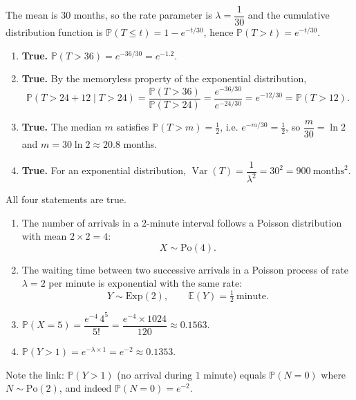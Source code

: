 \documentclass[11pt]{article}
\newcommand{\cle}[1]{{\popxbold\color{popdark}#1}}
\begin{document}
\begin{corrige}
The mean is $30$ months, so the rate parameter is $\lambda = \dfrac{1}{30}$ and the cumulative distribution function is $\mathbb{P}(T \le t) = 1 - e^{-t/30}$, hence $\mathbb{P}(T > t) = e^{-t/30}$.
\begin{enumerate}
\item \textbf{True.} $\mathbb{P}(T > 36) = e^{-36/30} = e^{-1.2}$.
\item \textbf{True.} By the \cle{memoryless property} of the exponential distribution,
\[
\mathbb{P}(T > 24 + 12 \mid T > 24) = \frac{\mathbb{P}(T > 36)}{\mathbb{P}(T > 24)} = \frac{e^{-36/30}}{e^{-24/30}} = e^{-12/30} = \mathbb{P}(T > 12).
\]
\item \textbf{True.} The median $m$ satisfies $\mathbb{P}(T > m) = \tfrac{1}{2}$, i.e. $e^{-m/30} = \tfrac{1}{2}$, so $\dfrac{m}{30} = \ln 2$ and $m = 30\ln 2 \approx 20.8$ months.
\item \textbf{True.} For an exponential distribution, $\operatorname{Var}(T) = \dfrac{1}{\lambda^2} = 30^2 = 900\ \mathrm{months}^2$.
\end{enumerate}
All four statements are true.
\end{corrige}

\begin{corrige}
\begin{enumerate}
\item The number of arrivals in a $2$-minute interval follows a Poisson distribution with mean $2 \times 2 = 4$:
\[
X \sim \mathrm{Po}(4).
\]
\item The waiting time between two successive arrivals in a Poisson process of rate $\lambda = 2$ per minute is exponential with the same rate:
\[
Y \sim \mathrm{Exp}(2), \qquad \mathbb{E}(Y) = \tfrac{1}{2}\ \mathrm{minute}.
\]
\item $\mathbb{P}(X = 5) = \dfrac{e^{-4}\,4^5}{5!} = \dfrac{e^{-4} \times 1024}{120} \approx 0.1563$.
\item $\mathbb{P}(Y > 1) = e^{-\lambda \times 1} = e^{-2} \approx 0.1353$.
\end{enumerate}
Note the link: $\mathbb{P}(Y > 1)$ (no arrival during $1$ minute) equals $\mathbb{P}(N = 0)$ where $N \sim \mathrm{Po}(2)$, and indeed $\mathbb{P}(N=0) = e^{-2}$.
\end{corrige}
\end{document}
